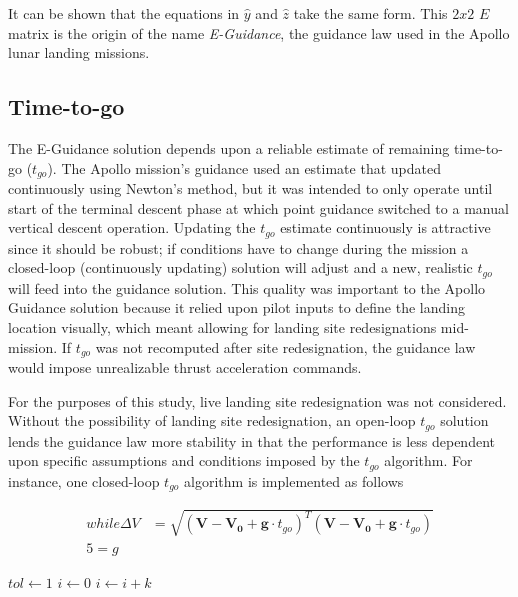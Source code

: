 It can be shown that the equations in $\hat{y}$ and $\hat{z}$ take the same form. This $2x2$ $E$ matrix is the origin of the name \textit{E-Guidance}, the guidance law used in the Apollo lunar landing missions.

\subsection{Time-to-go}
The E-Guidance solution depends upon a reliable estimate of remaining time-to-go ($t_{go}$). The Apollo mission's guidance used an estimate that updated continuously using Newton's method, but it was intended to only operate until start of the terminal descent phase at which point guidance switched to a manual vertical descent operation. Updating the $t_{go}$ estimate continuously is attractive since it should be robust; if conditions have to change during the mission a closed-loop (continuously updating) solution will adjust and a new, realistic $t_{go}$ will feed into the guidance solution. This quality was important to the Apollo Guidance solution because it relied upon pilot inputs to define the landing location visually, which meant allowing for landing site redesignations mid-mission. If $t_{go}$ was not recomputed after site redesignation, the guidance law would impose unrealizable thrust acceleration commands.

For the purposes of this study, live landing site redesignation was not considered. Without the possibility of landing site redesignation, an open-loop $t_{go}$ solution lends the guidance law more stability in that the performance is less dependent upon specific assumptions and conditions imposed by the $t_{go}$ algorithm. For instance, one closed-loop $t_{go}$ algorithm is implemented as follows

\begin{align}
while 
\label{eqn:tgoFPI}
\Delta V &= \sqrt{(\boldsymbol{V}-\boldsymbol{V_0} + \boldsymbol{g}\cdot t_{go})^T(\boldsymbol{V}-\boldsymbol{V_0} + \boldsymbol{g}\cdot t_{go})} \\ 
5 = g
\end{align}

\begin{algorithm}
\begin{algorithmic}
	\State $tol \gets 1$ 
	\State $i\gets 0$
	\Else
	\State $i\gets i+k$
	\EndIf
	\EndIf
\end{algorithmic}
\end{algorithm}


